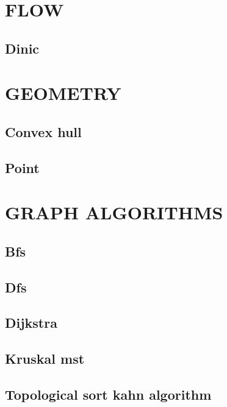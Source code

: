 \documentclass[10pt]{article}
\begin{document}
\section{FLOW}
\subsection{\texorpdfstring{Dinic}{Dinic}}


\section{GEOMETRY}
\subsection{\texorpdfstring{Convex hull}{Convex hull}}

\subsection{\texorpdfstring{Point}{Point}}


\section{GRAPH ALGORITHMS}
\subsection{\texorpdfstring{Bfs}{Bfs}}

\subsection{\texorpdfstring{Dfs}{Dfs}}

\subsection{\texorpdfstring{Dijkstra}{Dijkstra}}

\subsection{\texorpdfstring{Kruskal mst}{Kruskal mst}}

\subsection{\texorpdfstring{Topological sort kahn algorithm}{Topological sort kahn algorithm}}

\end{document}
